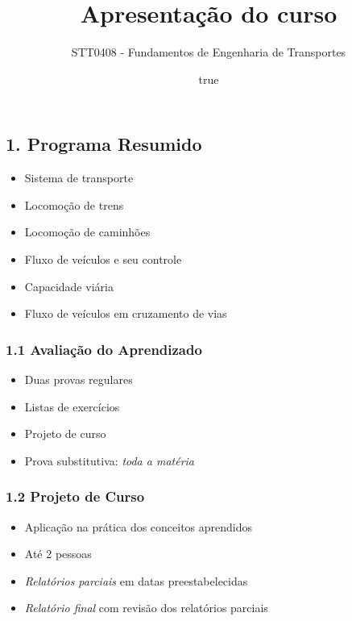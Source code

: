 \documentclass[
]{article}
\title{Apresentação do curso}
\subtitle{STT0408 - Fundamentos de Engenharia de Transportes}
\author{true}
\date{}
\providecommand{\tightlist}{%
  \setlength{\itemsep}{0pt}\setlength{\parskip}{0pt}}
\begin{document}
\maketitle

\hypertarget{programa-resumido}{%
\subsection{1. Programa Resumido}\label{programa-resumido}}

\begin{itemize}
\tightlist
\item
  Sistema de transporte
\item
  Locomoção de trens
\item
  Locomoção de caminhões
\item
  Fluxo de veículos e seu controle
\item
  Capacidade viária
\item
  Fluxo de veículos em cruzamento de vias
\end{itemize}

\hypertarget{avaliauxe7uxe3o-do-aprendizado}{%
\subsubsection{1.1 Avaliação do
Aprendizado}\label{avaliauxe7uxe3o-do-aprendizado}}

\begin{itemize}
\tightlist
\item
  Duas provas regulares
\item
  Listas de exercícios
\item
  Projeto de curso
\item
  Prova substitutiva: \emph{toda a matéria}
\end{itemize}

\hypertarget{projeto-de-curso}{%
\subsubsection{1.2 Projeto de Curso}\label{projeto-de-curso}}

\begin{itemize}
\tightlist
\item
  Aplicação na prática dos conceitos aprendidos
\item
  Até 2 pessoas
\item
  \emph{Relatórios parciais} em datas preestabelecidas
\item
  \emph{Relatório final} com revisão dos relatórios parciais
\end{itemize}
\end{document}
